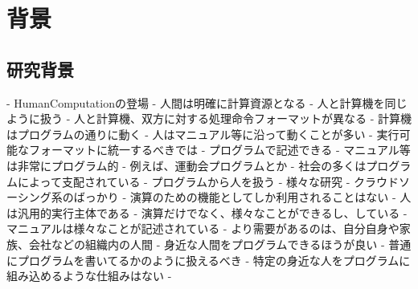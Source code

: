 \chapter{背景}
\label{chap:background}

\section{研究背景}

- HumanComputationの登場
  - 人間は明確に計算資源となる
- 人と計算機を同じように扱う
  - 人と計算機、双方に対する処理命令フォーマットが異なる
    - 計算機はプログラムの通りに動く
    - 人はマニュアル等に沿って動くことが多い
  - 実行可能なフォーマットに統一するべきでは
    - プログラムで記述できる
  - マニュアル等は非常にプログラム的
    - 例えば、運動会プログラムとか
  - 社会の多くはプログラムによって支配されている
- プログラムから人を扱う
  - 様々な研究
  - クラウドソーシング系のばっかり
  - 演算のための機能としてしか利用されることはない
- 人は汎用的実行主体である
  - 演算だけでなく、様々なことができるし、している
    - マニュアルは様々なことが記述されている
  - より需要があるのは、自分自身や家族、会社などの組織内の人間
    - 身近な人間をプログラムできるほうが良い
  - 普通にプログラムを書いてるかのように扱えるべき
- 特定の身近な人をプログラムに組み込めるような仕組みはない
  -

